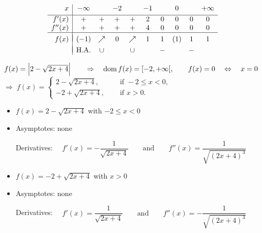 \begin{Answer}
    		
    		\[ \begin{array}{r|ccccccccc}
            x & -\infty & & -2 & & -1 & & 0 & & +\infty \\[0.1cm]
            \hline
            f'(x)   & + & + & + & + & 2 & 0 & 0 & 0 & 0\\
            f''(x)  & + & + & + & + & 4 & 0 & 0 & 0 & 0\\
            \hline
            &&&&&&&&&\vspace{-0.3cm}\\
            f(x)    & (-1) & \nearrow & 0 & \nearrow & 1 & 1 & (1) & 1 & 1\\
            &&&&&&&&&\vspace{-0.3cm}\\                  
            & \mbox{H.A.} & \cup &  & \cup &  & - &  & - &  \\
            \end{array}\]
    		
    		
    	\Question $f(x) = \left|  2- \sqrt{2x+4} \right| \qquad \Rightarrow \quad \text{dom}{\,}f(x)=[-2, + \infty[, \qquad f(x)=0 \quad \Leftrightarrow \quad x=0$ \\[0.2cm]
    		$\Rightarrow \; f(x)= \left\{ \begin{array}{ll} 2-\sqrt{2x+4}, & \quad \text{ if } -2 \leq x <0, \\
    		-2+\sqrt{2x+4}, & \quad \text{ if } x > 0. \end{array} \right.$ \\[0.2cm]
    		
    		\begin{itemize}
    		    \item $f(x) = 2-\sqrt{2x+4}$ \quad with $-2 \leq x <0$
    		    \item [] Asymptotes: \quad none \par
                         Derivatives: $\quad f'(x)=-\dfrac{1}{\sqrt{2x+4}} \qquad\mbox{and}\qquad f''(x)=\dfrac{1}{\sqrt{(2x+4)^3}}$
    		    
    		    \item $f(x) = -2+\sqrt{2x+4}$ \quad with $x > 0$
    		    \item [] Asymptotes: \quad none\par
                         Derivatives: $\quad f'(x)=\dfrac{1}{\sqrt{2x+4}} \qquad\mbox{and}\qquad f''(x)=-\dfrac{1}{\sqrt{(2x+4)^3}}$
    		\end{itemize}
    		

\end{Answer}
